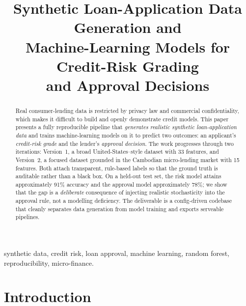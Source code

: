 \documentclass[conference]{IEEEtran}
\begin{document}
\title{Synthetic Loan-Application Data Generation and \\
Machine-Learning Models for Credit-Risk Grading \\
and Approval Decisions}

\author{
}

\maketitle

\begin{abstract}
Real consumer-lending data is restricted by privacy law and commercial
confidentiality, which makes it difficult to build and openly demonstrate
credit models. This paper presents a fully reproducible pipeline that
\emph{generates realistic synthetic loan-application data} and trains
machine-learning models on it to predict two outcomes: an applicant's
\emph{credit-risk grade} and the lender's \emph{approval decision}. The work
progresses through two iterations: Version~1, a broad United-States--style
dataset with 33 features, and Version~2, a focused dataset grounded in the
Cambodian micro-lending market with 15 features. Both attach
transparent, rule-based labels so that the ground truth is auditable rather
than a black box. On a held-out test set, the risk model attains approximately
91\% accuracy and the approval model approximately 78\%; we show that the gap is
a \emph{deliberate} consequence of injecting realistic stochasticity into the
approval rule, not a modelling deficiency. The deliverable is a config-driven
codebase that cleanly separates data generation from model training and exports
serveable pipelines.
\end{abstract}

\begin{IEEEkeywords}
synthetic data, credit risk, loan approval, machine learning, random forest,
reproducibility, micro-finance.
\end{IEEEkeywords}

\section{Introduction}
\end{document}
